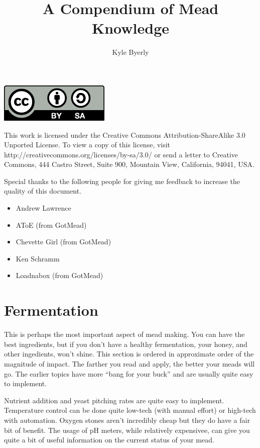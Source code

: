 \documentclass{article}
\title{A Compendium of Mead Knowledge}
\author{
  Kyle Byerly\\
}
\begin{document}
\maketitle
\newpage

\begin{center}
\includegraphics{by-sa.pdf}
\end{center}
This work is licensed under the Creative Commons Attribution-ShareAlike 3.0 Unported License. To view a copy of this license, visit http://creativecommons.org/licenses/by-sa/3.0/ or send a letter to Creative Commons, 444 Castro Street, Suite 900, Mountain View, California, 94041, USA.

\newpage

Special thanks to the following people for giving me feedback to increase the quality of this document.

\begin{itemize}
\item Andrew Lawrence
\item AToE (from GotMead)
\item Chevette Girl (from GotMead)
\item Ken Schramm
\item Loadnabox (from GotMead)
\end{itemize}


\newpage

\tableofcontents
\newpage

\section{Fermentation}
 This is perhaps the most important aspect of mead making. You can have the best ingredients, but if you don't have a healthy fermentation, your honey, and other ingedients,
 won't shine. This section is ordered in approximate order of the magnitude of impact. The farther you read and apply, the better your meads will go. The earlier topics have
 more ``bang for your buck'' and are  usually quite easy to implement. 

 Nutrient addition and yeast pitching rates are quite easy to implement. Temperature control can be done quite low-tech (with manual effort) or high-tech with automation. 
 Oxygen stones aren't incredibly cheap but they do have a fair bit of benefit. The usage of pH meters, while relatively expensivee, can give you quite a bit of useful
 information on the current status of your mead.
\end{document}
